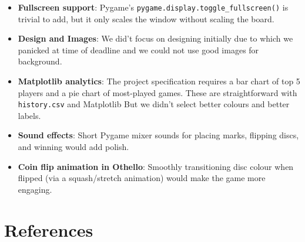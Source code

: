 \documentclass[12pt, letterpaper]{article}
\begin{document}
\begin{itemize}
    \item \textbf{Fullscreen support}: Pygame's
          \texttt{pygame.display.toggle\_fullscreen()} is trivial to add, but
          it only scales the window without scaling the board. 

    \item  \textbf{Design and Images}: We did't focus on designing initially due to which we panicked at time of deadline and we could not use good images for background.

    \item \textbf{Matplotlib analytics}: The project specification requires
          a bar chart of top 5 players and a pie chart of most-played games.
          These are straightforward with \texttt{history.csv} and Matplotlib But we didn't select better colours and better labels.

    


    \item \textbf{Sound effects}: Short Pygame mixer sounds for placing marks,
          flipping discs, and winning would add polish.

    \item \textbf{Coin flip animation in Othello}: Smoothly transitioning disc
          colour when flipped (via a squash/stretch animation) would make the
          game more engaging.
\end{itemize}

\section{References}


\end{document}
